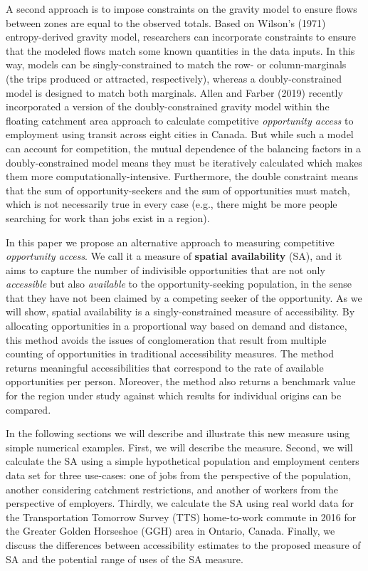 \documentclass[]{elsarticle} %
\begin{document}
A second approach is to impose constraints on the gravity model to
ensure flows between zones are equal to the observed totals. Based on
Wilson's (1971) entropy-derived gravity model, researchers can
incorporate constraints to ensure that the modeled flows match some
known quantities in the data inputs. In this way, models can be
singly-constrained to match the row- or column-marginals (the trips
produced or attracted, respectively), whereas a doubly-constrained model
is designed to match both marginals. Allen and Farber (2019) recently
incorporated a version of the doubly-constrained gravity model within
the floating catchment area approach to calculate competitive
\emph{opportunity access} to employment using transit across eight
cities in Canada. But while such a model can account for competition,
the mutual dependence of the balancing factors in a doubly-constrained
model means they must be iteratively calculated which makes them more
computationally-intensive. Furthermore, the double constraint means that
the sum of opportunity-seekers and the sum of opportunities must match,
which is not necessarily true in every case (e.g., there might be more
people searching for work than jobs exist in a region).

In this paper we propose an alternative approach to measuring
competitive \emph{opportunity access}. We call it a measure of
\textbf{spatial availability} (SA), and it aims to capture the number of
indivisible opportunities that are not only \emph{accessible} but also
\emph{available} to the opportunity-seeking population, in the sense
that they have not been claimed by a competing seeker of the
opportunity. As we will show, spatial availability is a
singly-constrained measure of accessibility. By allocating opportunities
in a proportional way based on demand and distance, this method avoids
the issues of conglomeration that result from multiple counting of
opportunities in traditional accessibility measures. The method returns
meaningful accessibilities that correspond to the rate of available
opportunities per person. Moreover, the method also returns a benchmark
value for the region under study against which results for individual
origins can be compared.

In the following sections we will describe and illustrate this new
measure using simple numerical examples. First, we will describe the
measure. Second, we will calculate the SA using a simple hypothetical
population and employment centers data set for three use-cases: one of
jobs from the perspective of the population, another considering
catchment restrictions, and another of workers from the perspective of
employers. Thirdly, we calculate the SA using real world data for the
Transportation Tomorrow Survey (TTS) home-to-work commute in 2016 for
the Greater Golden Horseshoe (GGH) area in Ontario, Canada. Finally, we
discuss the differences between accessibility estimates to the proposed
measure of SA and the potential range of uses of the SA measure.
\end{document}
